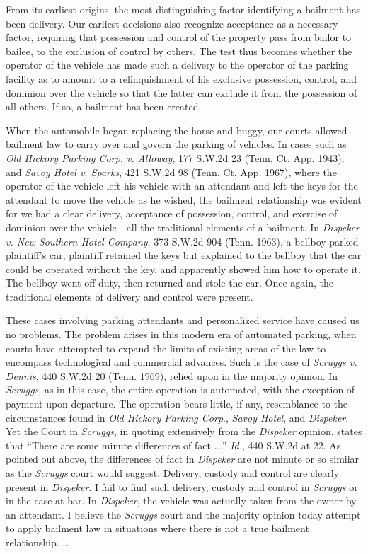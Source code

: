 From its earliest origins, the most distinguishing factor identifying a bailment
has been delivery. Our earliest decisions also recognize acceptance as a
necessary factor, requiring that possession and control of the property pass
from bailor to bailee, to the exclusion of control by others. The test thus
becomes whether the operator of the vehicle has made such a delivery to the
operator of the parking facility as to amount to a relinquishment of his
exclusive possession, control, and dominion over the vehicle so that the latter
can exclude it from the possession of all others. If so, a bailment has been
created.

When the automobile began replacing the horse and buggy, our courts allowed
bailment law to carry over and govern the parking of vehicles. In cases such as
\textit{Old Hickory Parking Corp. v. Alloway}, 177 S.W.2d 23 (Tenn. Ct. App.
1943), and \textit{Savoy Hotel v. Sparks}, 421 S.W.2d 98 (Tenn. Ct. App. 1967),
where the operator of the vehicle left his vehicle with an attendant and left
the keys for the attendant to move the vehicle as he wished, the bailment
relationship was evident for we had a clear delivery, acceptance of possession,
control, and exercise of dominion over the vehicle---all the traditional
elements of a bailment. In \textit{Dispeker v. New Southern Hotel Company}, 373
S.W.2d 904 (Tenn. 1963), a bellboy parked plaintiff's car, plaintiff retained
the keys but explained to the bellboy that the car could be operated without
the key, and apparently showed him how to operate it. The bellboy went off
duty, then returned and stole the car. Once again, the traditional elements of
delivery and control were present.

These cases involving parking attendants and personalized service have caused us
no problems. The problem arises in this modern era of automated parking, when
courts have attempted to expand the limits of existing areas of the law to
encompass technological and commercial advances. Such is the case of
\textit{Scruggs v. Dennis}, 440 S.W.2d 20 (Tenn. 1969), relied upon in the
majority opinion. In \textit{Scruggs}, as in this case, the entire operation is
automated, with the exception of payment upon departure. The operation bears
little, if any, resemblance to the circumstances found in \textit{Old Hickory
Parking Corp}., \textit{Savoy Hotel}, and \textit{Dispeker}. Yet the Court in
\emph{Scruggs}, in quoting extensively from the \textit{Dispeker} opinion,
states that
``There are some minute differences of fact \ldots.'' \emph{Id.}, 440 S.W.2d at
22. As
pointed out above, the differences of fact in \textit{Dispeker} are not minute
or so similar as the \textit{Scruggs} court would suggest. Delivery, custody
and control are clearly present in \textit{Dispeker}. I fail to find such
delivery, custody and control in \textit{Scruggs} or in the case at bar. In
\textit{Dispeker}, the vehicle was actually taken from the owner by an
attendant. I believe the \textit{Scruggs} court and the majority opinion today
attempt to apply bailment law in situations where there is not a true bailment
relationship. \ldots

